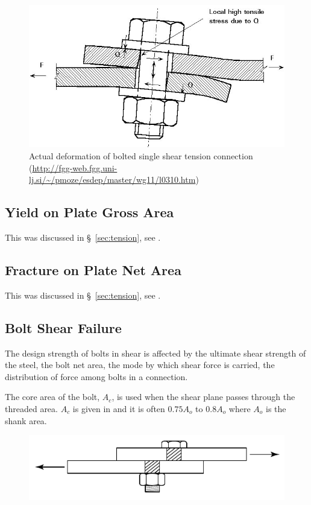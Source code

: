 \begin{figure}[H]
\centering
\includegraphics[scale=.5]{PIC/CH06/BD}
\caption{Actual deformation of bolted single shear tension connection (\href{http://fgg-web.fgg.uni-lj.si/~/pmoze/esdep/master/wg11/l0310.htm}{\url{http://fgg-web.fgg.uni-lj.si/~/pmoze/esdep/master/wg11/l0310.htm}})}
\end{figure}
\subsection{Yield on Plate Gross Area}
This was discussed in \S~\ref{sec:tension}, see .
\subsection{Fracture on Plate Net Area}
This was discussed in \S~\ref{sec:tension}, see .
\subsection{Bolt Shear Failure}
The design strength of bolts in shear is affected by the ultimate shear strength of the steel, the bolt net area, the mode by which shear force is carried, the distribution of force among bolts in a connection.

The core area of the bolt, $A_c$, is used when the shear plane passes through the threaded area. $A_c$ is given in  and it is often $0.75A_o$ to $0.8A_o$ where $A_o$ is the shank area.
\begin{figure}[H]
\centering
\includegraphics[scale=1.2]{PIC/CH06/BSF}
\end{figure}

